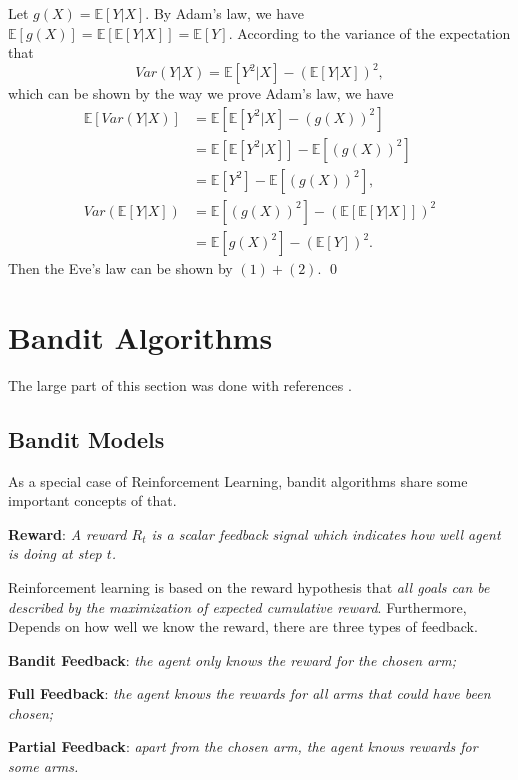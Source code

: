 \documentclass{progartcn}
\begin{document}
		Let $g(X)=\mathbb{E}[Y|X]$. By Adam's law, we have $\mathbb{E}[g(X)]=\mathbb{E}[\mathbb{E}[Y|X]]=\mathbb{E}[Y]$. According to the variance of the expectation that
		\[Var(Y|X)=\mathbb{E}[Y^2|X]-(\mathbb{E}[Y|X])^2,\]
		which can be shown by the way we prove Adam's law, we have
		\begin{align*}
		\mathbb{E}[Var(Y|X)]&=\mathbb{E}[\mathbb{E}[Y^2|X]-(g(X))^2]\\
		&=\mathbb{E}[\mathbb{E}[Y^2|X]]-\mathbb{E}[(g(X))^2]\\
		&=\mathbb{E}[Y^2]-\mathbb{E}[(g(X))^2], \tag{1}\\
		Var(\mathbb{E}[Y|X])&=\mathbb{E}[(g(X))^2]-(\mathbb{E}[\mathbb{E}[Y|X]])^2\\
		&=\mathbb{E}[g(X)^2]-(\mathbb{E}[Y])^2. \tag{2}
		\end{align*}
		Then the Eve's law can be shown by $(1)+(2)$.
		\qed\\

\pagebreak

\section{Bandit Algorithms}

	The large part of this section was done with references \cite{si252,sutton2018reinforcement,slivkins2019introduction,lattimore2018bandit,liblog}.\\

	\subsection{Bandit Models}

		As a special case of Reinforcement Learning, bandit algorithms share some important concepts of that.

		\textbf{Reward}: \textit{A reward $R_t$ is a scalar feedback signal which indicates how well agent is doing at step $t$.}

		Reinforcement learning is based on the reward hypothesis that \textit{all goals can be described by the maximization of expected cumulative reward}. Furthermore, Depends on how well we know the reward, there are three types of feedback.

		\textbf{Bandit Feedback}: \textit{the agent only knows the reward for the chosen arm;}

		\textbf{Full Feedback}: \textit{the agent knows the rewards for all arms that could have been chosen;}

		\textbf{Partial Feedback}: \textit{apart from the chosen arm, the agent knows rewards for some arms.}
\end{document}

